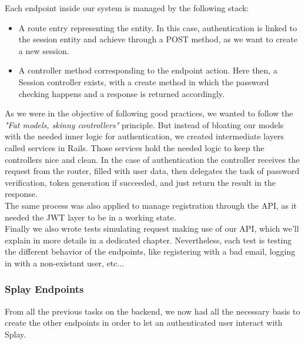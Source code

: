 \documentclass{eplmastersthesis}
\begin{document}
          Each endpoint inside our system is managed by the following stack:

          \begin{itemize}
            \item A route entry representing the entity. In this case,
            authentication is linked to the session entity and achieve through
            a POST method, as we want to create a new session.
            \item A controller method corresponding to the endpoint action.
            Here then, a Session controller exists, with a create method in
            which the password checking happens and a response is returned
            accordingly.
          \end{itemize}

          As we were in the objective of following good practices, we wanted
          to follow the \textit{"Fat models, skinny controllers"} principle.
          But instead of bloating our models with the needed inner logic for
          authentication, we created intermediate layers called services
          in Rails. Those services hold the needed logic to keep the controllers
          nice and clean. In the case of authentication the controller receives
          the request from the router, filled with user data, then delegates
          the task of password verification, token generation if succeeded,
          and just return the result in the response.\\

          The same process was also applied to manage registration through
          the API, as it needed the JWT layer to be in a working state.\\

          Finally we also wrote tests simulating request making use of our
          API, which we'll explain in more details in a dedicated chapter.
          Nevertheless, each test is testing the different behavior of
          the endpoints, like registering with a bad email, logging in with
          a non-existant user, etc...

        \subsubsection{Splay Endpoints}

          From all the previous tasks on the backend, we now had all the
          necessary basis to create the other endpoints in order to let
          an authenticated user interact with Splay.\\
\end{document}
